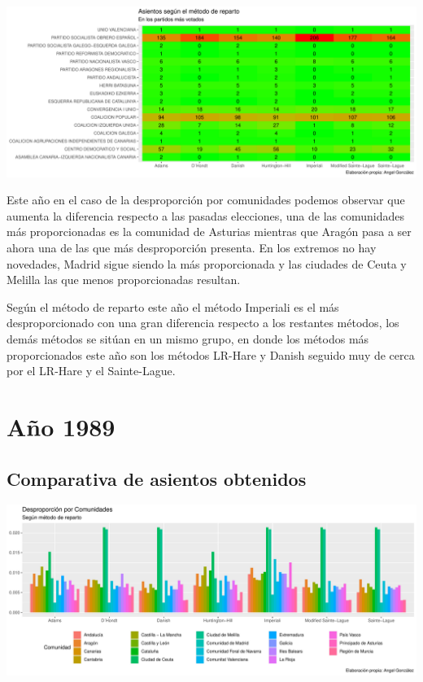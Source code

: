 \documentclass[12pt,a4paper,]{book}
\numberwithin{dummy}{section}
\theoremstyle{ocrenumbox}
\theoremstyle{blacknumex}
\theoremstyle{blacknumbox}
\theoremstyle{ocrenum}
\theoremstyle{ocrenum}
\begin{document}
\begin{center}\includegraphics[width=1\linewidth]{figurasR/unnamed-chunk-88-2} \end{center}

Este año en el caso de la desproporción por comunidades podemos observar
que aumenta la diferencia respecto a las pasadas elecciones, una de las
comunidades más proporcionadas es la comunidad de Asturias mientras que
Aragón pasa a ser ahora una de las que más desproporción presenta. En
los extremos no hay novedades, Madrid sigue siendo la más proporcionada
y las ciudades de Ceuta y Melilla las que menos proporcionadas resultan.

Según el método de reparto este año el método Imperiali es el más
desproporcionado con una gran diferencia respecto a los restantes
métodos, los demás métodos se sitúan en un mismo grupo, en donde los
métodos más proporcionados este año son los métodos LR-Hare y Danish
seguido muy de cerca por el LR-Hare y el Sainte-Lague.

\hypertarget{auxf1o-1989}{%
\section{Año 1989}\label{auxf1o-1989}}

\hypertarget{comparativa-de-asientos-obtenidos-4}{%
\subsection{Comparativa de asientos
obtenidos}\label{comparativa-de-asientos-obtenidos-4}}

\begin{center}\includegraphics[width=1\linewidth]{figurasR/unnamed-chunk-90-1} \end{center}
\end{document}
